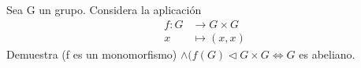 \question 
Sea G un grupo. Considera la aplicación
\begin{align*}
f: G &\to G \times G\\
x &\mapsto (x,x)
\end{align*}
Demuestra (f es un monomorfismo) 
$\land ({f(G) \triangleleft {G \times G}} \iff G$ es abeliano.